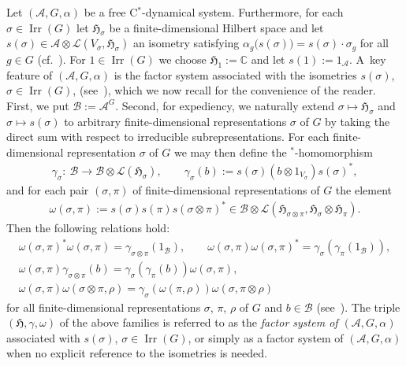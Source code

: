 \documentclass[pdftex]{sigma}
\numberwithin{equation}{section}
\newcommand*{\C}{\mathbb C}		%
\newcommand*{\tensor}{\otimes}		%
\newcommand*{\Star}{$^*$\nobreakdash}
\newcommand*{\hilb}{\mathfrak}		%
\newcommand*{\alg}{\mathcal}		%
\newcommand*{\hH}{\hilb{H}}			%
\newcommand*{\one}{1}				%
\newcommand*{\aA}{\alg{A}}			%
\newcommand*{\aB}{\alg{B}} 			%
\newcommand*{\End}{\mathcal{L}} %
\DeclareMathOperator{\Irrep}{Irr} 			%
\begin{document}
Let $(\aA,G,\alpha)$ be a free C\Star-dynamical system.
Furthermore, for each $\sigma \in \Irrep(G)$ let $\hH_\sigma$ be a finite-dimensional Hilbert space and let $s(\sigma) \in \aA \tensor \End(V_\sigma,\hH_\sigma)$ an isometry satisfying $\alpha_g\bigl(s(\sigma)\bigr)=s(\sigma) \cdot \sigma_g$ for all $g \in G$ (cf.~\cite[Lemma~3.3]{SchWa17c}).
For $1 \in \Irrep(G)$ we choose $\hH_1 := \C$ and let $s(1) := \one_\aA$.
A~key feature of $(\aA,G,\alpha)$ is the factor system associated with the isometries $s(\sigma)$, $\sigma \in \Irrep(G)$, (see~\cite[Definition~4.1]{SchWa17c}), which we now recall for the convenience of the reader.
First, we put $\aB := \aA^G$.
Second, for expediency, we naturally extend $\sigma \mapsto \hH_\sigma$ and $\sigma \mapsto s(\sigma)$ to arbitrary finite-dimensional representations $\sigma$ of $G$ by taking the direct sum with respect to irreducible subrepresentations.
For each finite-dimensional representation $\sigma$ of $G$ we may then define the \Star-homomorphism
\begin{gather*}
	\gamma_\sigma\colon \ \aB \to \aB \otimes \End(\hH_\sigma),
	\qquad
	\gamma_\sigma(b) := s(\sigma) (b \tensor \one_{V_\sigma}) s(\sigma)^*,
\end{gather*}
and for each pair $(\sigma,\pi)$ of finite-dimensional representations of $G$ the element
\begin{gather*}
	\omega(\sigma,\pi) := s(\sigma) s(\pi) s(\sigma \tensor \pi)^* \in \aB \tensor \End(\hH_{\sigma \tensor \pi},\hH_\sigma \tensor \hH_\pi).
\end{gather*}
Then the following relations hold:
\begin{gather}
	\label{eq:ranges_sys}
	\omega(\sigma,\pi)^* \omega(\sigma,\pi) = \gamma_{\sigma \tensor \pi}(\one_\aB),
	\qquad
	\omega(\sigma,\pi) \omega(\sigma,\pi)^* = \gamma_\sigma (\gamma_\pi(\one_\aB) ),
	\\
	\label{eq:coaction_sys}
	\omega(\sigma, \pi) \gamma_{\sigma \tensor \pi}(b) = \gamma_\sigma( \gamma_\pi(b) ) \omega(\sigma, \pi),
	\\
	\label{eq:cocycle_sys}
	\omega(\sigma, \pi) \omega(\sigma \tensor \pi, \rho)
		= \gamma_\sigma ( \omega(\pi, \rho) ) \omega(\sigma, \pi \tensor \rho)
\end{gather}
for all finite-dimensional representations $\sigma$, $\pi$, $\rho$ of $G$ and $b \in \aB$ (see~\cite[Lemma~4.3]{SchWa20}).
The triple $(\hH, \gamma, \omega)$ of the above families is referred to as the \emph{factor system of $(\aA, G, \alpha)$} associated with $s(\sigma)$, $\sigma \in \Irrep(G)$, or simply as a factor system of $(\aA, G, \alpha)$ when no explicit reference to the isometries is needed.
\end{document}
